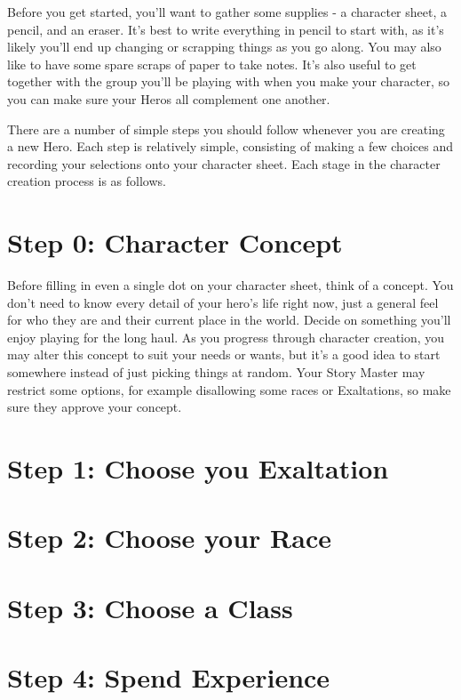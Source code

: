 \documentclass[10pt,twoside,openany]{book}
\begin{document}
\begin{multicols}{2}
		Before you get started, you'll want to gather some supplies
		- a character sheet, a pencil, and an eraser. It's best to write
		everything in pencil to start with, as it's likely you'll end up
		changing or scrapping things as you go along. You may also like to
		have some spare scraps of paper to take notes. It's also useful to get
		together with the group you'll be playing with when you make your
		character, so you can make sure your Heros all complement one another.

		There are a number of simple steps you should follow
		whenever you are creating a new Hero. Each step is relatively simple,
		consisting of making a few choices and recording your selections onto
		your character sheet. Each stage in the character creation process is
		as follows.

	\section{Step 0: Character Concept}

		Before filling in even a single dot on your character
		sheet, think of a concept. You don't need to know every detail of your
		hero's life right now, just a general feel for who they are and their
		current place in the world. Decide on something you'll enjoy playing
		for the long haul. As you progress through character creation, you may
		alter this concept to suit your needs or wants, but it's a good idea
		to start somewhere instead of just picking things at random. Your
		Story Master may restrict some options, for example disallowing some
		races or Exaltations, so make sure they approve your concept.

	\section{Step 1: Choose you Exaltation}

	\section{Step 2: Choose your Race}

	\section{Step 3: Choose a Class}

	\section{Step 4: Spend Experience}


\end{multicols}
\end{document}
